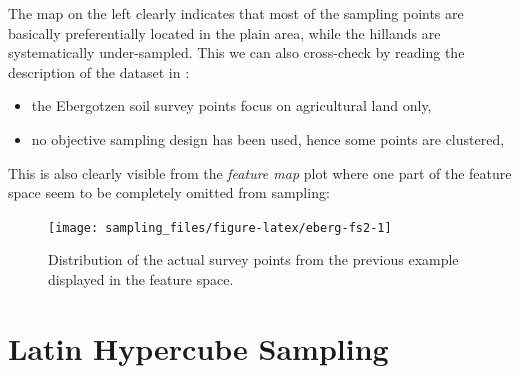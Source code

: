 \documentclass[
  graybox,natbib,nospthms]{svmono}
\newenvironment{Shaded}{\begin{snugshade}}{\end{snugshade}}
\newcommand{\AttributeTok}[1]{\textcolor[rgb]{0.61,0.61,0.61}{#1}}
\newcommand{\DecValTok}[1]{\textcolor[rgb]{0.06,0.06,0.06}{#1}}
\newcommand{\FunctionTok}[1]{\textcolor[rgb]{0,0,0}{#1}}
\newcommand{\NormalTok}[1]{#1}
\newcommand{\OtherTok}[1]{\textcolor[rgb]{0.37,0.37,0.37}{#1}}
\newcommand{\SpecialCharTok}[1]{\textcolor[rgb]{0,0,0}{#1}}
\newcommand{\StringTok}[1]{\textcolor[rgb]{0.5,0.5,0.5}{#1}}
\providecommand{\tightlist}{%
  \setlength{\itemsep}{0pt}\setlength{\parskip}{0pt}}
\providecommand{\tightlist}{\setlength{\itemsep}{0pt}\setlength{\parskip}{0pt}}
\begin{document}
The map on the left clearly indicates that most of the sampling points are
basically preferentially located in the plain area, while the hillands are
systematically under-sampled. This we can also cross-check by reading the
description of the dataset in \citet{Bohner2008Hamburg}:

\begin{itemize}
\tightlist
\item
  the Ebergotzen soil survey points focus on agricultural land only,\\
\item
  no objective sampling design has been used, hence some points are clustered,
\end{itemize}

This is also clearly visible from the \emph{feature map} plot where one part of the feature
space seem to be completely omitted from sampling:

\begin{Shaded}
\end{Shaded}

\begin{figure}

{\centering \texttt{[image: sampling\_files/figure-latex/eberg-fs2-1]} 

}

\caption{Distribution of the actual survey points from the previous example displayed in the feature space.}\label{fig:eberg-fs2}
\end{figure}

\hypertarget{latin-hypercube-sampling}{%
\section{Latin Hypercube Sampling}\label{latin-hypercube-sampling}}
\end{document}
